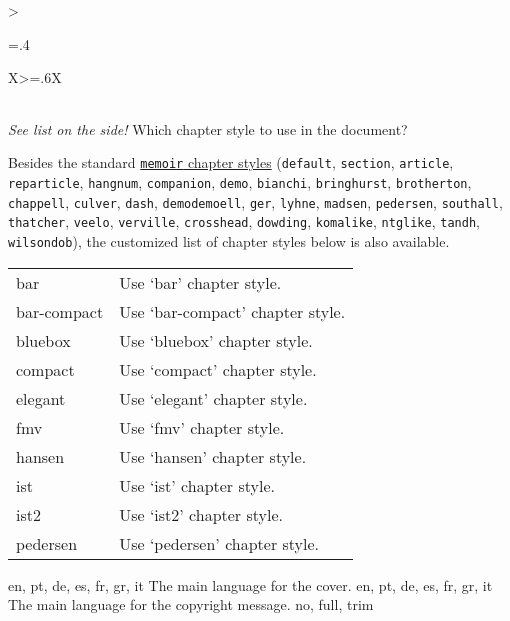 \begin{xltabular}{\linewidth}{>{\hsize=.4\hsize\raggedright\arraybackslash}X>{\hsize=.6\hsize}X}
{\begin{tabular}{@{}l@{ $\rightarrow$ }X@{}}
    \end{tabular}
    }
	    \midrule
	    {\emph{See list on the side!}}%
	    {Which chapter style to use in the document?}%
	{%
	Besides the standard \href{https://tug.ctan.org/info/MemoirChapStyles/MemoirChapStyles.pdf}{\texttt{memoir} chapter styles} (\texttt{default}, \texttt{section}, \texttt{article}, \texttt{reparticle}, \texttt{hangnum}, \texttt{companion}, \texttt{demo}, \texttt{bianchi}, \texttt{bringhurst}, \texttt{brotherton}, \texttt{chappell}, \texttt{culver}, \texttt{dash}, \texttt{demodemoell}, \texttt{ger}, \texttt{lyhne}, \texttt{madsen}, \texttt{pedersen}, \texttt{southall}, \texttt{thatcher}, \texttt{veelo}, \texttt{verville}, \texttt{crosshead}, \texttt{dowding}, \texttt{komalike}, \texttt{ntglike}, \texttt{tandh}, \texttt{wilsondob}), the customized list of chapter styles below is also available.
	    \begin{tabular}{@{}l@{ $\rightarrow$ }X@{}}
		bar 		& Use `bar' chapter style. \\
		bar-compact	& Use `bar-compact' chapter style.\\
		bluebox 	& Use `bluebox' chapter style.\\
		compact 	& Use `compact' chapter style.\\
		elegant 	& Use `elegant' chapter style.\\
		fmv 		& Use `fmv' chapter style.\\
		hansen 		& Use `hansen' chapter style.\\
		ist 		& Use `ist' chapter style.\\
		ist2 		& Use `ist2' chapter style.\\
		pedersen 	& Use `pedersen' chapter style.\\
	    \end{tabular}
	    }
    \midrule
    {en, pt, de, es, fr, gr, it}%
    {The main language for the cover.}%
	{%
    }
    \midrule
    {en, pt, de, es, fr, gr, it}%
    {The main language for the copyright message.}%
	{%
    }
    \midrule
    {no, full, trim}%

\end{xltabular}
